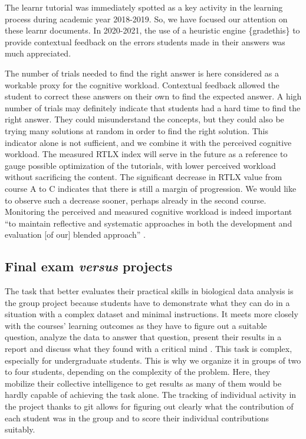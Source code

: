 \documentclass{aims}
\theoremstyle{definition}
\begin{document}
The learnr tutorial was immediately spotted as a key activity in the
learning process during academic year 2018-2019. So, we have focused our
attention on these learnr documents. In 2020-2021, the use of a
heuristic engine \{gradethis\} to provide contextual feedback on the
errors students made in their answers was much appreciated.

The number of trials needed to find the right answer is here considered
as a workable proxy for the cognitive workload. Contextual feedback
allowed the student to correct these answers on their own to find the
expected answer. A high number of trials may definitely indicate that
students had a hard time to find the right answer. They could
misunderstand the concepts, but they could also be trying many solutions
at random in order to find the right solution. This indicator alone is
not sufficient, and we combine it with the perceived cognitive workload.
The measured RTLX index will serve in the future as a reference to gauge
possible optimization of the tutorials, with lower perceived workload
without sacrificing the content. The significant decrease in RTLX value
from course A to C indicates that there is still a margin of
progression. We would like to observe such a decrease sooner, perhaps
already in the second course. Monitoring the perceived and measured
cognitive workload is indeed important ``to maintain reflective and
systematic approaches in both the development and evaluation {[}of
our{]} blended approach'' \cite{Spadafora2018}.

\hypertarget{final-exam-versus-projects-2}{%
\subsection{\texorpdfstring{Final exam \emph{versus}
projects}{Final exam versus projects}}\label{final-exam-versus-projects-2}}

The task that better evaluates their practical skills in biological data
analysis is the group project because students have to demonstrate what
they can do in a situation with a complex dataset and minimal
instructions. It meets more closely with the courses' learning outcomes
as they have to figure out a suitable question, analyze the data to
answer that question, present their results in a report and discuss what
they found with a critical mind \cite{Auker2020}. This task is complex,
especially for undergraduate students. This is why we organize it in
groups of two to four students, depending on the complexity of the
problem. Here, they mobilize their collective intelligence to get
results as many of them would be hardly capable of achieving the task
alone. The tracking of individual activity in the project thanks to git
allows for figuring out clearly what the contribution of each student
was in the group and to score their individual contributions suitably.
\end{document}
